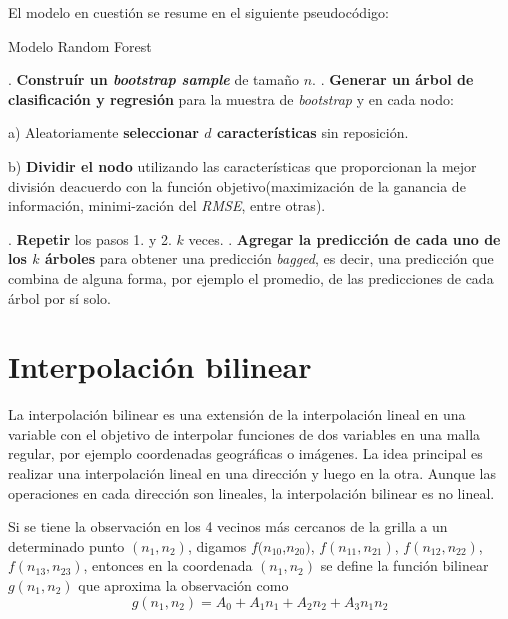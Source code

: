 El modelo en cuestión se resume en el siguiente pseudocódigo:

\newcommand{\INDSTATE}[1][1]{\STATE\hspace{#1\algorithmicindent}}

\begin{algorithm}[h]
    \caption{Modelo Random Forest}

    \begin{algorithmic}
            . \textbf{Construír un \textit{bootstrap sample}} de tamaño $n$.
            . \textbf{Generar un árbol de clasificación y regresión} para la muestra de \textit{bootstrap} y en cada nodo:

            \INDSTATE a) Aleatoriamente \textbf{seleccionar $d$ características} sin reposición.

            \INDSTATE b) \textbf{Dividir el nodo} utilizando las características que proporcionan la mejor división de\INDSTATE acuerdo con la función objetivo(maximización de la ganancia de información, minimi-\INDSTATE zación del \textit{RMSE}, entre otras).
            
            . \textbf{Repetir} los pasos 1. y 2. $k$ veces.
            . \textbf{Agregar la predicción de cada uno de los $k$ árboles} para obtener una predicción \textit{bagged}, es decir, una predicción que combina de alguna forma, por ejemplo el promedio, 
            de las predicciones de cada árbol por sí solo.
    \end{algorithmic}
\end{algorithm}



%
%
%
%
\section{Interpolación bilinear}
La interpolación bilinear es una extensión de la interpolación lineal en una variable con el objetivo de interpolar funciones de dos variables en una malla regular, por ejemplo coordenadas geográficas o imágenes.
La idea principal es realizar una interpolación lineal en una dirección y luego en la otra. Aunque las operaciones en cada dirección son lineales, la interpolación bilinear es no lineal. 

Si se tiene la observación en los 4 vecinos más cercanos de la grilla a un determinado punto $(n_1, n_2)$, digamos 
$f(n_{10}$,$n_{20})$, $f(n_{11},n_{21})$, $f(n_{12},n_{22})$, $f(n_{13},n_{23})$, entonces en la coordenada $(n_1, n_2)$ se define la 
función bilinear $g(n_1, n_2)$ que aproxima la observación como
\begin{equation}
    g(n_1, n_2) = A_0 + A_1 n_1 + A_2n_2 + A_3n_1n_2
\end{equation}

